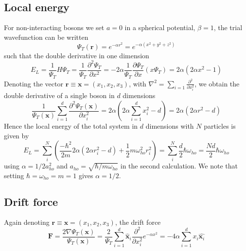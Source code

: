 \documentclass[a4paper, 10pt, english]{revtex4-2} %
\newcommand{\parder}[2]{\frac{\partial #1}{\partial #2}}
\newcommand{\dder}[2]{\frac{\partial^2 #1}{\partial #2^2}}
\begin{document}
    \subsection*{Local energy}
        For non-interacting bosons we set $a=0$ in a spherical potential, $\beta=1$, the trial wavefunction can be written
        \begin{equation}
                \Psi_T(\mathbf{r})
            =   e^{-\alpha r^2}
            =   e^{-\alpha (x^2 + y^2 + z^2)}
        \end{equation}
        such that the double derivative in one dimension
        \begin{equation}
                E_L 
            =   \frac{1}{\Psi_T}H\Psi_T
            =   \frac{1}{\Psi_T}\dder{\Psi_T}{x}
            =   -2\alpha\frac{1}{\Psi_T}\parder{\Psi_T}{x}\left(x\Psi_T\right)
            =   2\alpha{\left(2\alpha x^2 - 1\right)}
        \end{equation}
        Denoting the vector $\mathbf{r} \equiv \mathbf{x} = (x_1, x_2, x_3)$, with $\nabla^2 = \sum_{i=1}\dder{}{x_i}$, we obtain the double derivative of a single boson in $d$ dimensions
        \begin{equation}
                \frac{1}{\Psi_T(\mathbf{x})} \sum_{i=1}^d \dder{\Psi_T(\mathbf{x})}{x_i}
            =   2\alpha\left(2\alpha\sum_{i=1}^dx_i^2 - d\right)
            =   2\alpha\left(2\alpha r^2 - d\right)
        \end{equation}
        Hence the local energy of the total system in $d$ dimensions with $N$ particles is given by
        \begin{equation}
                E_L
            =   \sum_i^N\left(\frac{-\hbar^2}{2m}2\alpha\left(2\alpha r_i^2 - d\right) + \frac{1}{2}m\omega_{ho}^2r_i^2\right)
            =   \sum_i^N\frac{d}{2}\hbar\omega_{ho}
            =   \frac{Nd}{2}\hbar\omega_{ho}
            \label{eq: localEnergy}
        \end{equation}
        using $\alpha = 1/2a_{ho}^2$ and $a_{ho} = \sqrt{\hbar/m\omega_{ho}}$ in the second calculation.
        We note that setting $\hbar=\omega_{ho}=m=1$ gives $\alpha=1/2$.

    \subsection*{Drift force}
        Again denoting $\mathbf{r} \equiv \mathbf{x} = (x_1, x_2, x_3)$, the drift force
        \begin{equation}
                \mathbf{F}
            =   \frac{2\nabla \Psi_T(\mathbf{x})}{\Psi_T(\mathbf{x})}
            =   \frac{2}{\Psi_T}\sum_{i=1}^d \hat{\mathbf{x}}_i\dder{}{x_i}e^{-\alpha x^2}
            =   -4\alpha \sum_{i=1}^d x_i \hat{\mathbf{x}_i}
        \end{equation}
\end{document}

